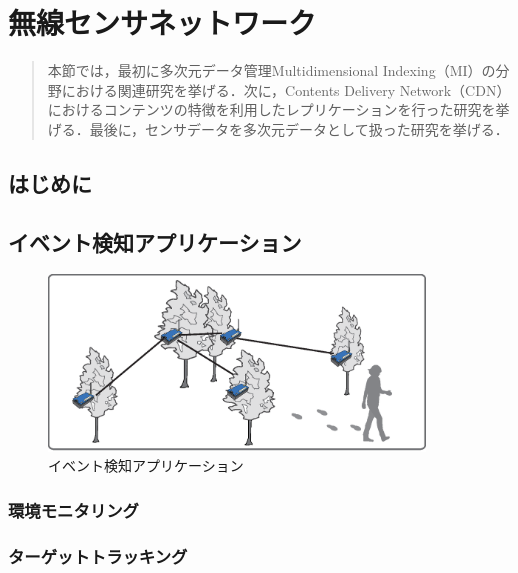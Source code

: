 \chapter{無線センサネットワーク}
\begin{large}
\begin{quote}
本節では，最初に多次元データ管理Multidimensional Indexing（MI）の分野における関連研究を挙げる．次に，Contents Delivery Network（CDN）におけるコンテンツの特徴を利用したレプリケーションを行った研究を挙げる．最後に，センサデータを多次元データとして扱った研究を挙げる．
\end{quote}
\end{large}
\clearpage

\section{はじめに}


\section{イベント検知アプリケーション}
\begin{figure}[htbp]
 \begin{center}
  \includegraphics[width=100mm]{./images/event_detection.eps}
 \end{center}
 \caption{イベント検知アプリケーション}
 \label{fig:event_detection}
\end{figure}

\subsection{環境モニタリング}


\subsection{ターゲットトラッキング}



